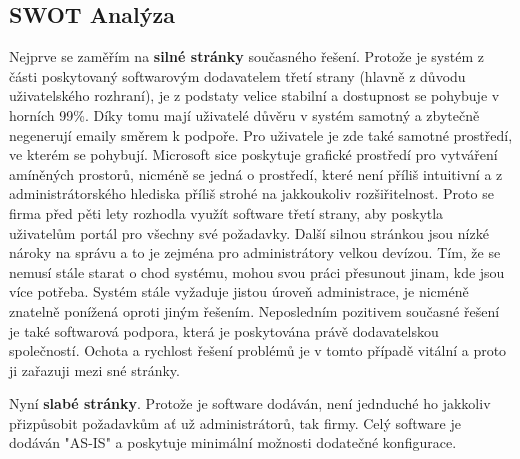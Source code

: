 \documentclass{article}
\begin{document}
\begin{sloppypar}
\begin{spacing}{1.15}
        \subsection*{SWOT Analýza}
        Nejprve se zaměřím na \textbf{silné stránky} současného řešení. Protože
        je systém z části poskytovaný softwarovým dodavatelem třetí strany
        (hlavně z důvodu uživatelského rozhraní), je z podstaty velice stabilní a
        dostupnost se pohybuje v horních 99\%. Díky tomu mají uživatelé důvěru v
        systém samotný a zbytečně negenerují emaily směrem k podpoře. Pro
        uživatele je zde také samotné prostředí, ve kterém se pohybují.
        Microsoft sice poskytuje grafické prostředí pro vytváření amíněných
        prostorů, nicméně se jedná o prostředí, které není příliš intuitivní a 
        z administrátorského hlediska příliš strohé na jakkoukoliv
        rozšiřitelnost. Proto se firma před pěti lety rozhodla využít software
        třetí strany, aby poskytla uživatelům portál pro všechny své požadavky.
        Další silnou stránkou jsou nízké nároky na správu a to je zejména pro 
        administrátory velkou devízou. Tím, že se nemusí stále starat o chod
        systému, mohou svou práci přesunout jinam, kde jsou více potřeba. Systém
        stále vyžaduje jistou úroveň administrace, je nicméně znatelně ponížená
        oproti jiným řešením. Neposledním pozitivem současné řešení je také
        softwarová podpora, která je poskytována právě dodavatelskou
        společností. Ochota a rychlost řešení problémů je v tomto případě
        vitální a proto ji zařazuji mezi sné stránky.

        Nyní \textbf{slabé stránky}. Protože je software dodáván, není jednduché
        ho jakkoliv přizpůsobit požadavkům ať už administrátorů, tak firmy. Celý
        software je dodáván "AS-IS" a poskytuje minimální možnosti dodatečné
        konfigurace. 


\end{spacing}
\end{sloppypar}
\end{document}
